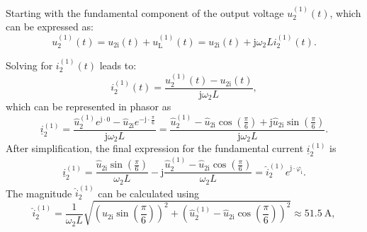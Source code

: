 \begin{solutionblock}
    Starting with the fundamental component of the output voltage $u^\mathrm{(1)}_\mathrm{2}(t)$, which can be expressed as:
    \begin{equation}
        u^\mathrm{(1)}_\mathrm{2}(t) = u_{2\mathrm{i}}(t) + u^\mathrm{(1)}_{\mathrm{L}}(t) = u_{2\mathrm{i}}(t) + \mathrm{j} \omega_\mathrm{2} L i^\mathrm{(1)}_\mathrm{2}(t).
        \label{7.1.2:eq:u_2_fund}         
    \end{equation}
   
    Solving for $i^\mathrm{(1)}_\mathrm{2}(t)$ leads to:
    \begin{equation}
        i^\mathrm{(1)}_\mathrm{2}(t) = \frac{u^\mathrm{(1)}_\mathrm{2}(t) - u_{2\mathrm{i}}(t)}{\mathrm{j} \omega_\mathrm{2} L},
        \label{7.1.2:eq:i_2_fund}         
    \end{equation}
    which can be represented in phasor as 
    \begin{equation}
        \underline{i}^\mathrm{(1)}_\mathrm{2} = \frac{\hat{u}^\mathrm{(1)}_\mathrm{2} e^{\mathrm{j} \cdot 0} - \hat{u}_{2\mathrm{i}} e^{-\mathrm{j} \cdot \frac{\pi}{6}}}{\mathrm{j} \omega_\mathrm{2} L} = \frac{\hat{u}^\mathrm{(1)}_\mathrm{2} - \hat{u}_{2\mathrm{i}} \cos(\frac{\pi}{6}) + \mathrm{j} \hat{u}_{2\mathrm{i}} \sin(\frac{\pi}{6})}{\mathrm{j} \omega_\mathrm{2} L}.
        \label{7.1.2:eq:i_2_fund_phasor}         
    \end{equation}
    After simplification, the final expression for the fundamental current $\underline{i}^\mathrm{(1)}_\mathrm{2}$ is 
    \begin{equation}
        \underline{i}^\mathrm{(1)}_\mathrm{2} = \frac{\hat{u}_{2\mathrm{i}} \sin(\frac{\pi}{6})}{\omega_\mathrm{2} L} - \mathrm{j} \frac{\hat{u}^\mathrm{(1)}_\mathrm{2} - \hat{u}_{2\mathrm{i}} \cos(\frac{\pi}{6})}{\omega_\mathrm{2} L} = \hat{i}^\mathrm{(1)}_\mathrm{2} e^{\mathrm{j} \cdot \varphi_\mathrm{i}}.
        \label{7.1.2:eq:i_2_fund_simplified}         
    \end{equation}
    The magnitude $\hat{i}^\mathrm{(1)}_\mathrm{2}$ can be calculated using 
    \begin{equation}
        \hat{i}^\mathrm{(1)}_\mathrm{2} = \frac{1}{\omega_\mathrm{2} L}\sqrt{(\hat{u}_{2\mathrm{i}} \sin(\frac{\pi}{6}))^2 + (\hat{u}^\mathrm{(1)}_\mathrm{2} - \hat{u}_{2\mathrm{i}} \cos(\frac{\pi}{6}))^2} \approx \SI{51.5}{\ampere},
        \label{7.1.2:eq:mag_i_2_fund}         
    \end{equation}

\end{solutionblock}
